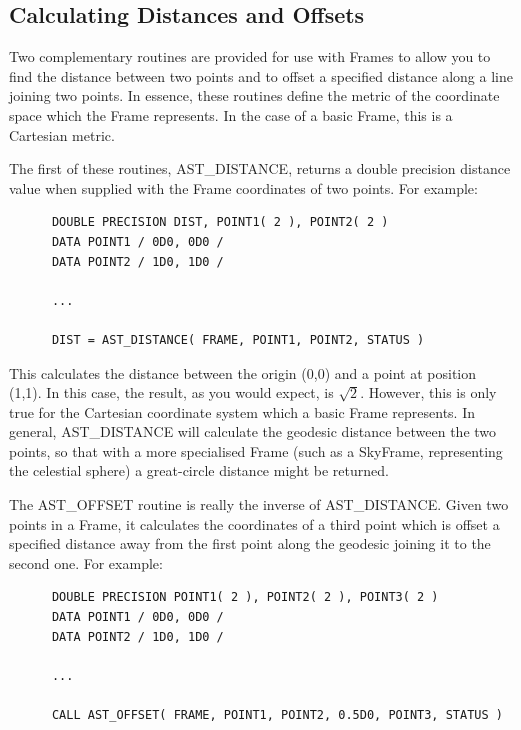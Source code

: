 \documentclass[twoside,11pt]{article}
\newcommand{\htmlref}[2]{#1}
\begin{document}
\subsection{\label{ss:distanceandoffset}Calculating Distances and Offsets}

Two complementary routines are provided for use with Frames to allow
you to find the distance between two points and to offset a specified
distance along a line joining two points.  In essence, these routines
define the metric of the coordinate space which the \htmlref{Frame}{Frame}
represents. In the case of a basic Frame, this is a Cartesian metric.

The first of these routines, \htmlref{AST\_DISTANCE}{AST_DISTANCE}, returns a double precision
distance value when supplied with the Frame coordinates of two
points. For example:

\small
\begin{verbatim}
      DOUBLE PRECISION DIST, POINT1( 2 ), POINT2( 2 )
      DATA POINT1 / 0D0, 0D0 /
      DATA POINT2 / 1D0, 1D0 /

      ...

      DIST = AST_DISTANCE( FRAME, POINT1, POINT2, STATUS )
\end{verbatim}
\normalsize

This calculates the distance between the origin (0,0) and a point at
position (1,1). In this case, the result, as you would expect, is
$\surd{2}$. However, this is only true for the Cartesian coordinate
system which a basic Frame represents. In general, AST\_DISTANCE will
calculate the geodesic distance between the two points, so that with a
more specialised Frame (such as a \htmlref{SkyFrame}{SkyFrame}, representing the celestial
sphere) a great-circle distance might be returned.

The \htmlref{AST\_OFFSET}{AST_OFFSET} routine is really the inverse of AST\_DISTANCE. Given
two points in a Frame, it calculates the coordinates of a third point
which is offset a specified distance away from the first point along
the geodesic joining it to the second one. For example:

\small
\begin{verbatim}
      DOUBLE PRECISION POINT1( 2 ), POINT2( 2 ), POINT3( 2 )
      DATA POINT1 / 0D0, 0D0 /
      DATA POINT2 / 1D0, 1D0 /

      ...

      CALL AST_OFFSET( FRAME, POINT1, POINT2, 0.5D0, POINT3, STATUS )
\end{verbatim}
\normalsize
\end{document}
